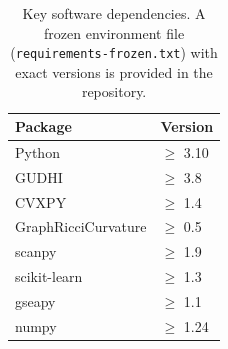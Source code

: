 \documentclass[11pt]{article}
\begin{document}
\begin{table}[h]
\centering
\small
\begin{tabular}{ll}
\toprule
Package & Version \\
\midrule
Python & $\geq$ 3.10 \\
GUDHI & $\geq$ 3.8 \\
CVXPY & $\geq$ 1.4 \\
GraphRicciCurvature & $\geq$ 0.5 \\
scanpy & $\geq$ 1.9 \\
scikit-learn & $\geq$ 1.3 \\
gseapy & $\geq$ 1.1 \\
numpy & $\geq$ 1.24 \\
\bottomrule
\end{tabular}
\caption{Key software dependencies. A frozen environment file (\texttt{requirements-frozen.txt}) with exact versions is provided in the repository.}
\label{tab:supp_software}
\end{table}
\end{document}
